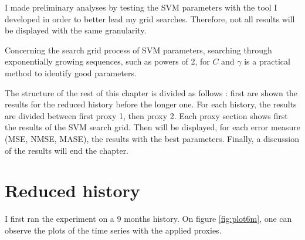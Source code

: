 \documentclass[11pt,a4paper,oneside]{book}
\begin{document}
I made preliminary analyses by testing the SVM parameters with the tool I developed in order to better lead my grid searches. Therefore, not all results will be displayed with the same granularity.

Concerning the search grid process of SVM parameters, searching through exponentially growing sequences, such as powers of 2, for $C$ and $\gamma$ is a practical method to identify good parameters. \cite{Hsu}

The structure of the rest of this chapter is divided as follows : first are shown the results for the reduced history before the longer one. For each history, the results are divided between first proxy 1, then proxy 2. Each proxy section shows first the results of the SVM search grid. Then will be displayed, for each error measure (MSE, NMSE, MASE), the results with the best parameters. Finally, a discussion of the results will end the chapter.



\section{Reduced history}

I first ran the experiment on a 9 months history. On figure \ref{fig:plot6m}, one can observe the plots of the time series with the applied proxies.
\end{document}
